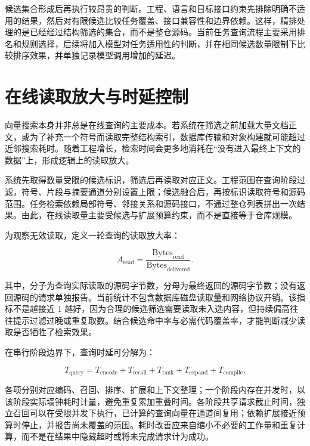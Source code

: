 候选集合形成后再执行较昂贵的判断。工程、语言和目标接口约束先排除明确不适用的结果，然后对有限候选比较任务覆盖、接口兼容性和边界依赖。这样，精排处理的是已经经过结构筛选的集合，而不是整仓源码。当前任务查询流程主要采用排名和规则选择，后续将加入模型对任务适用性的判断，并在相同候选数量限制下比较排序效果，并单独记录模型调用增加的延迟。

\section{在线读取放大与时延控制}

向量搜索本身并非总是在线查询的主要成本。若系统在筛选之前加载大量文档正文，或为了补充一个符号而读取完整结构索引，数据库传输和对象构建就可能超过近邻搜索耗时。随着工程增长，检索时间会更多地消耗在“没有进入最终上下文的数据”上，形成逻辑上的读取放大。

系统先取得数量受限的候选标识，筛选后再读取对应正文。工程范围在查询阶段过滤，符号、片段与摘要通道分别设置上限；候选融合后，再按标识读取符号和源码范围。任务检索依赖局部符号、邻接关系和源码接口，不通过整仓列表拼出一次结果。由此，在线读取量主要受候选与扩展预算约束，而不是直接等于仓库规模。

为观察无效读取，定义一轮查询的读取放大率：

\begin{equation}
A_{\mathrm{read}}=\frac{\mathrm{Bytes}_{\mathrm{read}}}{\mathrm{Bytes}_{\mathrm{delivered}}}.
\end{equation}

其中，分子为查询实际读取的源码字节数，分母为最终返回的源码字节数；没有返回源码的请求单独报告。当前统计不包含数据库磁盘读取量和网络协议开销。该指标不是越接近 1 越好，因为合理的候选筛选需要读取未入选内容，但持续偏高往往提示过滤过晚或重复取数。结合候选命中率与必需代码覆盖率，才能判断减少读取是否牺牲了检索效果。

在串行阶段边界下，查询时延可分解为：

\begin{equation}
T_{\mathrm{query}}=T_{\mathrm{encode}}+T_{\mathrm{recall}}+T_{\mathrm{rank}}+T_{\mathrm{expand}}+T_{\mathrm{compile}}.
\end{equation}

各项分别对应编码、召回、排序、扩展和上下文整理；一个阶段内存在并发时，以该阶段实际墙钟耗时计量，避免重复累加重叠时间。各阶段共享请求截止时间，独立召回可以在受限并发下执行，已计算的查询向量在通道间复用；依赖扩展接近预算时停止，并报告尚未覆盖的范围。耗时改善应来自缩小不必要的工作量和重复计算，而不是在结果中隐藏超时或将未完成请求计为成功。

